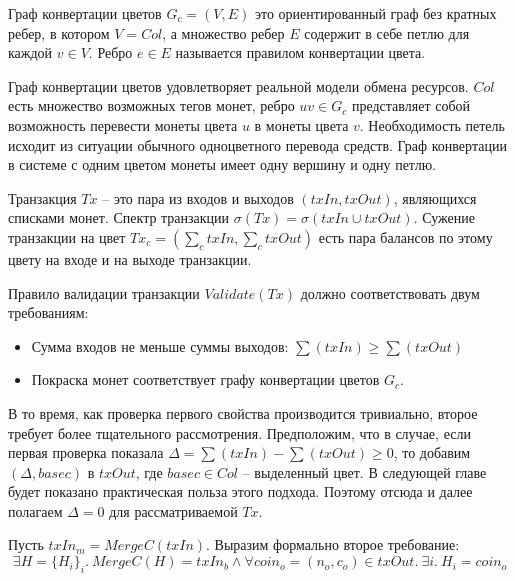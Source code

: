 \documentclass[specification,annotation]{itmo-student-thesis}
\begin{document}
\begin{definition}
Граф конвертации цветов $G_c = (V,E)$ это ориентированный граф без
кратных ребер, в котором $V = Col$, а множество ребер $E$ содержит в
себе петлю для каждой $v \in V$. Ребро $e \in E$ называется правилом
конвертации цвета.
\end{definition}

Граф конвертации цветов удовлетворяет реальной модели обмена
ресурсов. $Col$ есть множество возможных тегов монет, ребро $uv \in
G_c$ представляет собой возможность перевести монеты цвета $u$ в
монеты цвета $v$. Необходимость петель исходит из ситуации обычного
одноцветного перевода средств. Граф конвертации в системе с одним
цветом монеты имеет одну вершину и одну петлю.

\begin{definition}
Транзакция $Tx$ -- это пара из входов и выходов $(txIn, txOut)$,
являющихся списками монет. Спектр транзакции $\sigma(Tx) = \sigma(txIn
\cup txOut)$. Сужение транзакции на цвет $Tx_c = (\sum_c{txIn},
\sum_c{txOut})$ есть пара балансов по этому цвету на входе и на выходе
транзакции.
\end{definition}

Правило валидации транзакции $Validate(Tx)$ должно соответствовать
двум требованиям:
\begin{itemize}
\item Сумма входов не меньше суммы выходов: $\sum(txIn) \geq \sum(txOut)$
\item Покраска монет соответствует графу конвертации цветов $G_c$.
\end{itemize}

В то время, как проверка первого свойства производится тривиально,
второе требует более тщательного рассмотрения. Предположим, что в
случае, если первая проверка показала $\Delta = \sum(txIn) -
\sum(txOut) \geq 0$, то добавим $(\Delta, basec)$ в $txOut$, где
$basec \in Col$ -- выделенный цвет. В следующей главе будет показано
практическая польза этого подхода. Поэтому отсюда и далее полагаем
$\Delta = 0$ для рассматриваемой $Tx$.

Пусть $txIn_m = MergeC(txIn)$. Выразим формально второе требование:
$$
\exists H = \{H_i\}_i. \ MergeC(H) = txIn_b \wedge \forall coin_o = (n_o,c_o) \in txOut . \ \exists i . \ H_i = coin_o
$$
\end{document}
